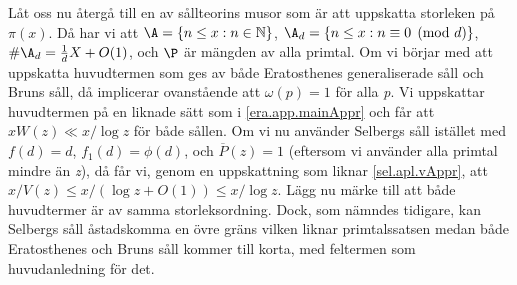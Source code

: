 Låt oss nu återgå till en av sållteorins musor som är att uppskatta storleken på \(\pi(x)\).
Då har vi att \(\A = \{n \leq x: n \in \mathbb{N}\}\), \(\A_d = \{n \leq x: n\equiv 0 \pmod d\}\), \(\#\A_d = \frac{1}{d}X + O(1)\), och \(\P\) är mängden av alla primtal. 
Om vi börjar med att uppskatta huvudtermen som ges av både Eratosthenes generaliserade såll och Bruns såll, då implicerar ovanstående att \(\omega(p) = 1\) för alla \textit{p}.
Vi uppskattar huvudtermen på en liknade sätt som i \eqref{era.app.mainAppr} och får att \(xW(z) \ll x/\log z\) för både sållen.
Om vi nu använder Selbergs såll istället med \(f(d) = d\), \(f_1(d) = \phi(d)\), och \(\overline{P}(z) = 1\) (eftersom vi använder alla primtal mindre än \textit{z}), då får vi, genom en uppskattning som liknar \eqref{sel.apl.vAppr}, att \(x/V(z) \leq x/(\log z + O(1)) \leq x/\log z\).
Lägg nu märke till att både huvudtermer är av samma storleksordning.
Dock, som nämndes tidigare, kan Selbergs såll åstadskomma en övre gräns vilken liknar primtalssatsen medan både Eratosthenes och Bruns såll kommer till korta, med feltermen som huvudanledning för det.


